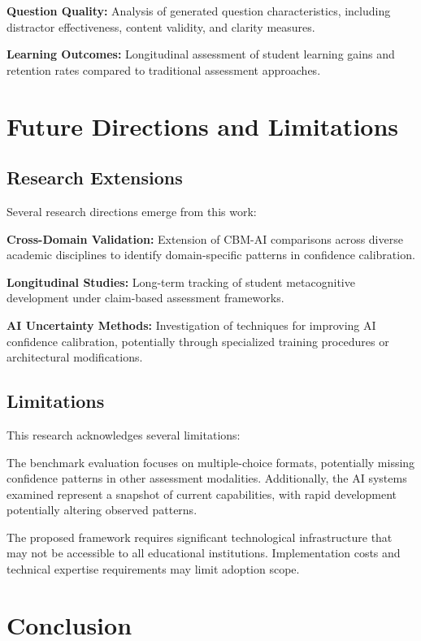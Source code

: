 \documentclass[sigconf]{acmart}
\begin{document}
\textbf{Question Quality:} Analysis of generated question characteristics, including distractor effectiveness, content validity, and clarity measures.

\textbf{Learning Outcomes:} Longitudinal assessment of student learning gains and retention rates compared to traditional assessment approaches.

\section{Future Directions and Limitations}

\subsection{Research Extensions}

Several research directions emerge from this work:

\textbf{Cross-Domain Validation:} Extension of CBM-AI comparisons across diverse academic disciplines to identify domain-specific patterns in confidence calibration.

\textbf{Longitudinal Studies:} Long-term tracking of student metacognitive development under claim-based assessment frameworks.

\textbf{AI Uncertainty Methods:} Investigation of techniques for improving AI confidence calibration, potentially through specialized training procedures or architectural modifications.

\subsection{Limitations}

This research acknowledges several limitations:

The benchmark evaluation focuses on multiple-choice formats, potentially missing confidence patterns in other assessment modalities. Additionally, the AI systems examined represent a snapshot of current capabilities, with rapid development potentially altering observed patterns.

The proposed framework requires significant technological infrastructure that may not be accessible to all educational institutions. Implementation costs and technical expertise requirements may limit adoption scope.

\section{Conclusion}
\end{document}

